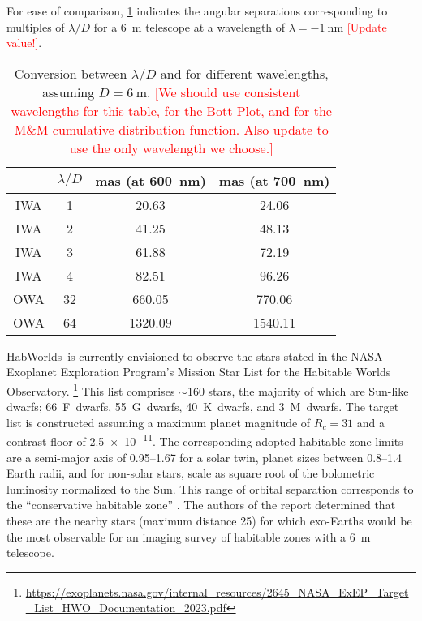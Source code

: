 \documentclass[
    usenatbib,
]{mnras}
\newcommand{\todo}[1]{\textcolor{red}{[#1]}}
\newcommand{\hwo}{HabWorlds}
\begin{document}
For ease of comparison, \cref{tab:IWA_OWA} indicates the angular separations corresponding to multiples of $\lambda / D$ for a \SI{6}{\meter} telescope at a wavelength of $\lambda = \SI{-1}{\nano\meter}$ \todo{Update value!}.

\begin{table}
    \centering
    \caption{
        Conversion between $\lambda / D$ and \si{\mas} for different wavelengths, assuming $D = \SI{6}{\meter}$. 
        \todo{We should use consistent wavelengths for this table, for the Bott Plot, and for the M\&M cumulative distribution function. Also update to use the only wavelength we choose.}
    }
    \label{tab:IWA_OWA}
    \begin{tabular}{ c c c c } 
    \toprule
     & $\lambda/D$ & mas (at \SI{600}{\nano\meter}) & mas (at \SI{700}{\nano\meter}) \\
    \midrule
    \midrule
    IWA & 1 & 20.63 & 24.06 \\
    IWA & 2 & 41.25 & 48.13 \\
    IWA & 3 & 61.88 & 72.19 \\
    IWA & 4 & 82.51 & 96.26 \\
    \midrule
    OWA & 32 &  660.05 & 770.06 \\
    OWA & 64 & 1320.09 & 1540.11 \\
    \bottomrule
    \end{tabular}
\end{table}


\hwo\ is currently envisioned to observe the stars stated in the NASA Exoplanet Exploration Program's Mission Star List for the Habitable Worlds Observatory.%
\footnote{\url{https://exoplanets.nasa.gov/internal_resources/2645_NASA_ExEP_Target_List_HWO_Documentation_2023.pdf}}
%
This list comprises $\sim$160 stars, the majority of which are Sun-like dwarfs; 66~F~dwarfs, 55~G~dwarfs, 40~K~dwarfs, and 3~M~dwarfs.
%
The target list is constructed assuming a maximum planet magnitude of $R_c = 31$ and a contrast floor of \num{2.5e-11}. 
The corresponding adopted habitable zone limits are a semi-major axis of \SIrange{0.95}{1.67}{\au} for a solar twin, planet sizes between \SIrange{0.8}{1.4}{} Earth radii, and for non-solar stars, scale as square root of the bolometric luminosity normalized to the Sun. 
%
This range of orbital separation corresponds to the \enquote{conservative habitable zone} \citep{kasting93, kopparapu13}. 
The authors of the report determined that these are the nearby stars (maximum distance \SI{25}{\parsec}) for which exo-Earths would be the most observable for an imaging survey of habitable zones with a \SI{6}{\meter} telescope. 
\end{document}

